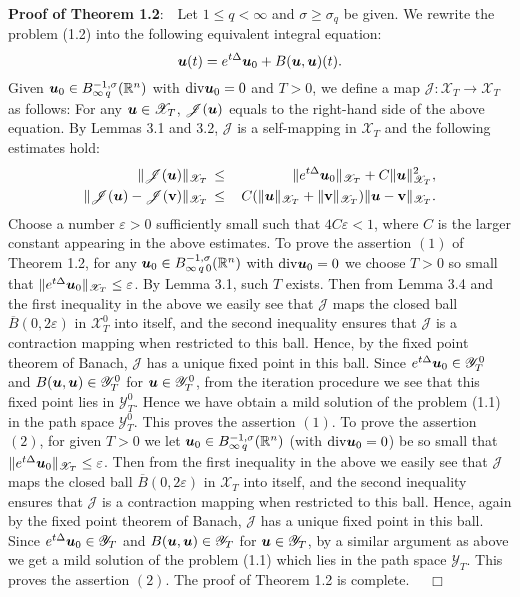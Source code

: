 \documentclass[11pt]{article}
\newcommand{\epsln}{\varepsilon}
\newcommand{\diva}{{\rm div}}
\newcommand{\bfu}{{\mbox{\boldmath $u$}}}
\begin{document}
  {\bf Proof of Theorem 1.2}:\ \ Let $1\leqslant q<\infty$ and $\sigma\geqslant\sigma_q$ be given. We rewrite the problem (1.2) into the following
  equivalent integral equation:
$$
  \bfu(t)=e^{t\Delta}\bfu_0+B(\bfu,\bfu)(t).
$$
  Given $\bfu_0\in B^{-1,\sigma}_{\infty\, q}(\mathbb{R}^n)$ with $\diva\bfu_0=0$ and $T>0$, we define a map $\mathscr{J}:\mathscr{X}_T\to\mathscr{X}_T$ as
  follows: For any $\bfu\in\mathscr{X}_T$, $\mathscr{J}(\bfu)$ equals to the right-hand side of the above equation. By Lemmas 3.1 and 3.2, $\mathscr{J}$
  is a self-mapping in $\mathscr{X}_T$ and the following estimates hold:
\begin{eqnarray*}
  \|\mathscr{J}(\bfu)\|_{\mathscr{X}_T}&\,\leq\,&
  \|e^{t\Delta}\bfu_0\|_{\mathscr{X}_T}+C\|\bfu\|_{\mathscr{X}_T}^2,
\\
  \|\mathscr{J}(\bfu)-\mathscr{J}(\mathbf{v})\|_{\mathscr{X}_T}&\,\leq\,&
  C(\|\bfu\|_{\mathscr{X}_T}+\|\mathbf{v}\|_{\mathscr{X}_T})
  \|\bfu-\mathbf{v}\|_{\mathscr{X}_T}.
\end{eqnarray*}
  Choose a number $\varepsilon>0$ sufficiently small such that $4C\epsln<1$, where $C$ is the larger constant appearing in the above estimates. To prove
  the assertion $(1)$ of Theorem 1.2, for any $\bfu_0\in B^{-1,\sigma}_{\infty\,q\,0}(\mathbb{R}^n)$ with $\diva\bfu_0=0$ we choose $T>0$ so small that
  $\|e^{t\Delta}\bfu_0\|_{\mathscr{X}_T}\leq\epsln$. By Lemma 3.1, such $T$ exists. Then from Lemma 3.4 and the first inequality in the above we
  easily see that $\mathscr{J}$ maps the closed ball $\overline{B}(0,2\epsln)$ in $\mathscr{X}_T^0$ into itself, and the second inequality ensures that
  $\mathscr{J}$ is a contraction mapping when restricted to this ball. Hence, by the fixed point theorem of Banach, $\mathscr{J}$ has a unique fixed
  point in this ball. Since $e^{t\Delta}\bfu_0\in\mathscr{Y}_T^0$ and $B(\bfu,\bfu)\in\mathscr{Y}_T^0$ for $\bfu\in\mathscr{Y}_T^0$, from the iteration
  procedure we see that this fixed point lies in $\mathscr{Y}_T^0$. Hence we have obtain a mild solution of the problem (1.1) in the path space
  $\mathscr{Y}_T^0$. This proves the assertion $(1)$. To prove the assertion $(2)$, for given $T>0$ we let $\bfu_0\in B^{-1,\sigma}_{\infty\,q}
  (\mathbb{R}^n)$ (with $\diva\bfu_0=0$) be so small that $\|e^{t\Delta}\bfu_0\|_{\mathscr{X}_T}\leq\epsln$. Then from the first inequality in the above
  we easily see that $\mathscr{J}$ maps the closed ball $\overline{B}(0,2\epsln)$ in $\mathscr{X}_T$ into itself, and the second inequality ensures that
  $\mathscr{J}$ is a contraction mapping when restricted to this ball. Hence, again by the fixed point theorem of Banach, $\mathscr{J}$ has a unique
  fixed point in this ball. Since $e^{t\Delta}\bfu_0\in\mathscr{Y}_T$ and $B(\bfu,\bfu)\in\mathscr{Y}_T$ for $\bfu\in \mathscr{Y}_T$, by a similar
  argument as above we get a mild solution of the problem (1.1) which lies in the path space $\mathscr{Y}_T$. This proves the assertion $(2)$. The
  proof of Theorem 1.2 is complete. $\quad\Box$
\end{document}
